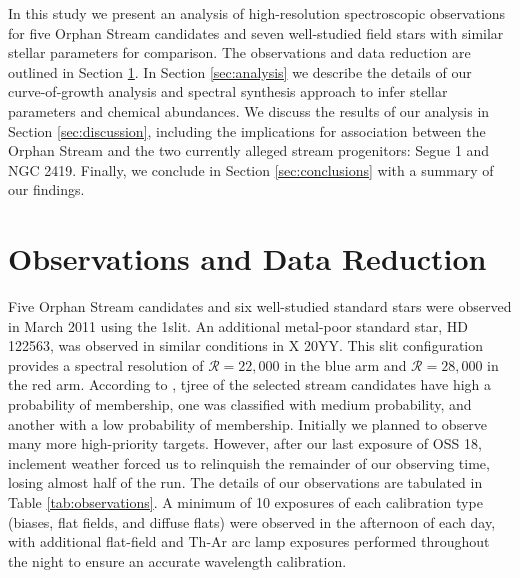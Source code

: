 \documentclass{emulateapj}
\begin{document}
In this study we present an analysis of high-resolution spectroscopic observations for five Orphan Stream candidates and seven well-studied field stars with similar stellar parameters for comparison. The observations and data reduction are outlined in Section \ref{sec:observations}. In Section \ref{sec:analysis} we describe the details of our curve-of-growth analysis and spectral synthesis approach to infer stellar parameters and chemical abundances. We discuss the results of our analysis in Section \ref{sec:discussion}, including the implications for association between the Orphan Stream and the two currently alleged stream progenitors: Segue 1 and NGC 2419. Finally, we conclude in Section \ref{sec:conclusions} with a summary of our findings.



\section{Observations and Data Reduction}
\label{sec:observations}



Five Orphan Stream candidates and six well-studied standard stars were observed in March 2011 using the 1\arcsec slit. An additional metal-poor standard star, HD 122563, was observed in similar conditions in X 20YY. This slit configuration provides a spectral resolution of $\mathcal{R} = 22,000$ in the blue arm and $\mathcal{R} = 28,000$ in the red arm. According to \citet{casey;et-al_2013a}, tjree of the selected stream candidates have high a probability of membership, one was classified with medium probability, and another with a low probability of membership. Initially we planned to observe many more high-priority targets. However, after our last exposure of OSS 18, inclement weather forced us to relinquish the remainder of our observing time, losing almost half of the run. The details of our observations are tabulated in Table \ref{tab:observations}. A minimum of 10 exposures of each calibration type (biases, flat fields, and diffuse flats) were observed in the afternoon of each day, with additional flat-field and Th-Ar arc lamp exposures performed throughout the night to ensure an accurate wavelength calibration.
\end{document}
